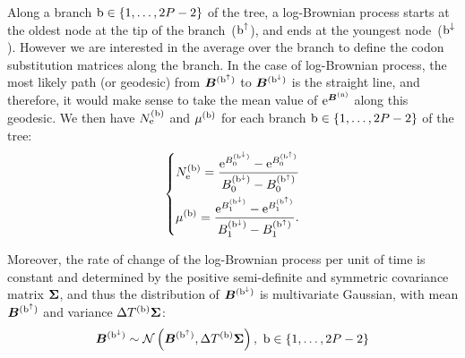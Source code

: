 Along a branch $\text{b} \in \{1, \hdots, 2 P - 2\}$ of the tree, a log-Brownian process starts at the oldest node at the tip of the branch~($\text{b}^{\uparrow}$), and ends at the youngest node~($\text{b}^{\downarrow}$).
However we are interested in the average over the branch to define the \gls{codon} \gls{substitution} matrices along the branch.
In the case of log-Brownian process, the most likely path (or geodesic) from $\bm{B}^{(\text{b}^{\uparrow})}$ to $\bm{B}^{(\text{b}^{\downarrow})}$ is the straight line, and therefore, it would make sense to take the mean value of $\mathrm{e}^{\bm{B}^{(\text{n})}}$ along this geodesic.
We then have $N_{\mathrm{e}}^{(\text{b})}$ and $\mu^{(\text{b})}$ for each branch $\text{b} \in \{1, \hdots, 2 P - 2\}$ of the tree:
\begin{equation}
\label{eq:branchNemu}
\begin{dcases}
\Ne\branchexp = \dfrac{\e^{\brownian_{0}^{(\nodeDown)}} - \e^{\brownian_{0}^{(\nodeUp)}}}{\brownian_{0}^{(\nodeDown)} - \brownian_{0}^{(\nodeUp)}} \\ 
\mu\branchexp = \dfrac{\e^{\brownian_{1}^{(\nodeDown)}} - \e^{\brownian_{1}^{(\nodeUp)}}}{\brownian_{1}^{(\nodeDown)} - \brownian_{1}^{(\nodeUp)}}.
\end{dcases}
\end{equation}

Moreover, the rate of change of the log-Brownian process per unit of time is constant and determined by the positive semi-definite and symmetric covariance matrix $\bm{\Sigma}$, and thus the distribution of $\bm{B}^{(\text{b}^{\downarrow})}$ is multivariate Gaussian, with mean $\bm{B}^{(\text{b}^{\uparrow})}$ and variance $\Delta T^{(\text{b})} \bm{\Sigma}$:
\begin{equation}
\label{eq:DistribBrownian}
\Brownian^{(\nodeDown)} \sim \mathcal{N}\left(\Brownian^{(\nodeUp)}, \branchtime\branchexp \CovarianceMatrix \right),\ \Setbranch
\end{equation}

